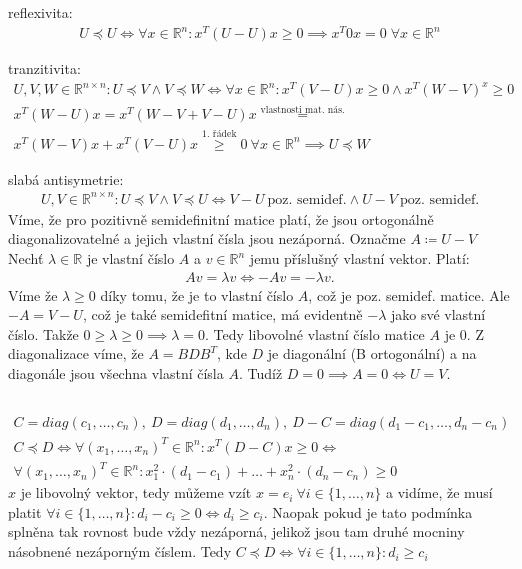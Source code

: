\documentclass[12pt, a4paper]{article}
\begin{document}
\subsection{}
reflexivita:
\begin{gather*}
U \preceq U \iff \forall x \in \mathbb{R}^n: x^T(U - U)x \geq 0 \implies x^T\mathit{0}x=0  \; \forall x \in \mathbb{R}^n
\end{gather*}

tranzitivita:
\begin{gather*}
U,V,W \in \mathbb{R}^{n \times n}: U \preceq V \land V \preceq W \iff \forall x \in \mathbb{R}^n: x^T(V-U)x \geq 0 \land x^T(W-V)^x \geq 0\\
x^T(W-U)x = x^T(W-V+V-U)x \stackrel{\text{vlastnosti mat. nás.}}{=}\\
x^T(W-V)x + x^T(V-U)x \stackrel{\text{1. řádek}}{\geq} 0\ \forall x \in \mathbb{R}^n \implies U \preceq W
\end{gather*}

slabá antisymetrie:
\begin{gather*}
U,V \in \mathbb{R}^{n \times n}: U \preceq V \land V \preceq U \iff V-U \ \text{poz. semidef.} \land U-V \ \text{poz. semidef.} 
\end{gather*}
Víme, že pro pozitivně semidefinitní matice platí, že jsou ortogonálně diagonalizovatelné a jejich vlastní čísla jsou nezáporná. Označme $A \coloneqq U - V$
Nechť $\lambda \in \mathbb{R}$ je vlastní číslo $A$ a $v \in \mathbb{R}^n$ jemu příslušný vlastní vektor. Platí:
\begin{gather*}
Av=\lambda v \iff -Av = - \lambda v.
\end{gather*}
Víme že $\lambda \geq 0$ díky tomu, že je to vlastní číslo $A$, což je poz. semidef. matice. Ale $-A = V-U$, což je také semidefitní matice, má evidentně $-\lambda$ jako své vlastní číslo. Takže $0 \geq \lambda \geq 0 \implies \lambda = 0$. Tedy libovolné vlastní číslo matice $A$ je 0. Z diagonalizace víme, že $A = BDB^T$, kde $D$ je diagonální (B ortogonální) a na diagonále jsou všechna vlastní čísla $A$. Tudíž $D=0 \implies A=0 \iff U = V$.

\subsection{}
\begin{gather*}
C = diag(c_1,\dots, c_n),\ D = diag(d_1,\dots, d_n),\ D-C=diag(d_1-c_1,\dots, d_n-c_n)\\
C \preceq D \iff \forall (x_1,\dots, x_n)^T \in \mathbb{R}^n: x^T(D-C)x \geq 0 \iff \\
\forall (x_1,\dots, x_n)^T \in \mathbb{R}^n: x_1^2 \cdot (d_1-c_1) + \dots + x_n^2 \cdot (d_n-c_n) \geq 0
\end{gather*}
$x$ je libovolný vektor, tedy můžeme vzít $x = e_i \ \forall i \in \{1,\dots,n\}$ a vidíme, že musí platit $\forall i \in \{1,\dots,n\}: d_i-c_i \geq 0 \iff d_i \geq c_i$. Naopak pokud je tato podmínka splněna tak rovnost bude vždy nezáporná, jelikož jsou tam druhé mocniny násobnené nezáporným číslem. Tedy $C \preceq D \iff \forall i \in \{1,\dots,n\}: d_i \geq c_i$
\end{document}
